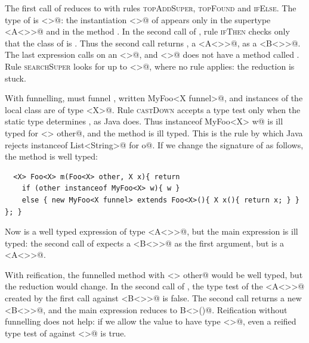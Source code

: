 The first call of \Q@m@ reduces \Q@eA@ to \Q@vA@ with rules \textsc{topAddSuper}, \textsc{topFound} and \textsc{ifElse}.
The type of \Q@vA@ is \Q@MyFoo<>@: the instantiation \Q@A<>@ of \Q@X@ appears only in the supertype \Q@Foo<A<>>@ and in the method \Q@x@.
In the second call of \Q@m@, rule \textsc{ifThen} checks only that the class of \Q@vA@ is \Q@MyFoo@.
Thus the second call returns \Q@vA@, a \Q@Foo<A<>>@, as a \Q@Foo<B<>>@.
The last expression calls \Q@onlyB@ on an \Q@A<>@, and \Q@A<>@ does not have a method called \Q@onlyB@.
Rule \textsc{searchSuper} looks for \Q@onlyB@ up to \Q@Object<>@, where no rule applies: the reduction is stuck.

With funnelling, \Q@MyFoo@ must funnel \Q@X@, written \Q@new MyFoo<X funnel>@,
and instances of the local class are of type \Q@MyFoo<X>@.
Rule \textsc{castDown} accepts a type test only when the static type determines \Q@X@, as Java does.
Thus \Q@other instanceof MyFoo<X> w@ is ill typed for \Q@Object<> other@, and the method \Q@m@ is ill typed.
This is the rule by which Java rejects \Q@o instanceof List<String>@ for \Q@Object o@.
If we change the signature of \Q@m@ as follows, the method \Q@m@ is well typed:

\medskip\noindent\begin{minipage}{\linewidth}
\begin{lstlisting}
  <X> Foo<X> m(Foo<X> other, X x){ return
    if (other instanceof MyFoo<X> w){ w }
    else { new MyFoo<X funnel> extends Foo<X>(){ X x(){ return x; } } }; }
\end{lstlisting}
\end{minipage}

Now \Q@eA@ is a well typed expression of type \Q@Foo<A<>>@, but the main expression is ill typed:
the second call of \Q@m@ expects a \Q@Foo<B<>>@ as the first argument, but \Q@eA@ is a \Q@Foo<A<>>@.

With reification, the funnelled method \Q@m@ with \Q@Object<> other@ would be well typed, but the reduction would change.
In the second call of \Q@m@, the type test of the \Q@MyFoo<A<>>@ created by the first call against \Q@MyFoo<B<>>@ is false.
The second call returns a new \Q@MyFoo<B<>>@, and the main expression reduces to \Q@new B<>()@.
Reification without funnelling does not help:
if we allow the value \Q@vA@ to have type \Q@MyFoo<>@, even a reified type test of \Q@vA@ against \Q@MyFoo<>@ is true.
